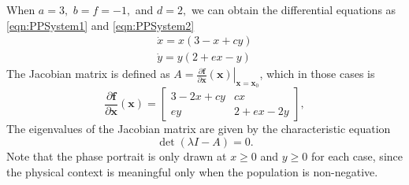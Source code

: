 When $a=3,$ $b=f=-1,$ and $d=2,$ we can obtain the differential equations as  \eqref{eqn:PPSystem1} and \eqref{eqn:PPSystem2}
\begin{subequations}\label{eqn:PPSystem}
\begin{align}
    \dot{x} = x(3-x+cy) \label{eqn:PPSystem1} \\
    \dot{y} = y(2+ex-y) \label{eqn:PPSystem2}
\end{align}
\end{subequations}
The Jacobian matrix is defined as $A = \left. \frac{\partial\textbf{f}}{\partial \textbf{x}}(\textbf{x}) \right|_{\textbf{x}=\textbf{x}_0}$, which in those cases is
\begin{equation*}
    \frac{\partial\textbf{f}}{\partial \textbf{x}}(\textbf{x}) =
    \left[\begin{array}{cc}
    3-2x+cy & cx \\
    ey & 2+ex-2y
    \end{array}\right],
\end{equation*}
The eigenvalues of the Jacobian matrix are given by the characteristic equation
\begin{equation*}
    \det(\lambda I - A) = 0.
\end{equation*}
Note that the phase portrait is only drawn at $x\geq0$ and $y\geq0$ for each case, since the physical context is meaningful only when the population is non-negative.
